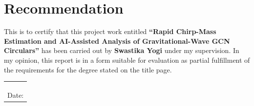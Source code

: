 \chapter*{Recommendation}

This is to certify that this project work entitled \textbf{``Rapid Chirp-Mass Estimation and AI-Assisted Analysis of Gravitational-Wave GCN Circulars''} has been carried out by \textbf{Swastika Yogi} under my supervision. %
In my opinion, this report is in a form suitable for evaluation as partial fulfillment of the requirements for the degree stated on the title page.

\vspace{2cm}
\noindent
\begin{tabular}{@{}l}
\hrulefill \\
[SUPERVISOR NAME] \\ %
[SUPERVISOR TITLE / DEPARTMENT] \\ %
Date: \underline{\hspace{4cm}}
\end{tabular}
